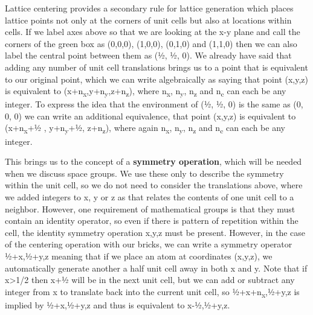  Lattice centering provides a secondary rule for lattice generation which places lattice points not only at the corners of unit cells but also at locations within cells. If we label axes above so that we are looking at the x-y plane and call the corners of the green box as (0,0,0), (1,0,0), (0,1,0) and (1,1,0) then we can also label the central point between them as (½, ½, 0). We already have said that adding any number of unit cell translations brings us to a point that is equivalent to our original point, which we can write algebraically as saying that point (x,y,z) is equivalent to (x+n\textsubscript{x},y+n\textsubscript{y},z+n\textsubscript{z}), where n\textsubscript{x}, n\textsubscript{y}, n\textsubscript{z} and n\textsubscript{c} can each be any integer. To express the idea that the environment of (½, ½, 0) is the same as (0, 0, 0) we can write an additional equivalence, that point (x,y,z) is equivalent to (x+n\textsubscript{x}+½ , y+n\textsubscript{y}+½, z+n\textsubscript{z}), where again n\textsubscript{x}, n\textsubscript{y}, n\textsubscript{z} and n\textsubscript{c} can each be any integer. 

 This brings us to the concept of a \textbf{symmetry operation}, which will be needed when we discuss space groups. We use these only to describe the symmetry within the unit cell, so we do not need to consider the translations above, where we added integers to x, y or z as that relates the contents of one unit cell to a neighbor. However, one requirement of mathematical groups is that they must contain an identity operator, so even if there is pattern of repetition within the cell, the identity symmetry operation x,y,z must be present. However, in the case of the centering operation with our bricks, we can write a symmetry operator ½+x,½+y,z meaning that if we place an atom at coordinates (x,y,z), we automatically generate another a half unit cell away in both x and y. Note that if x>1/2 then x+½ will be in the next unit cell, but we can add or subtract any integer from x to translate back into the current unit cell, so ½+x+n\textsubscript{x},½+y,z is implied by ½+x,½+y,z and thus is equivalent to x-½,½+y,z.

